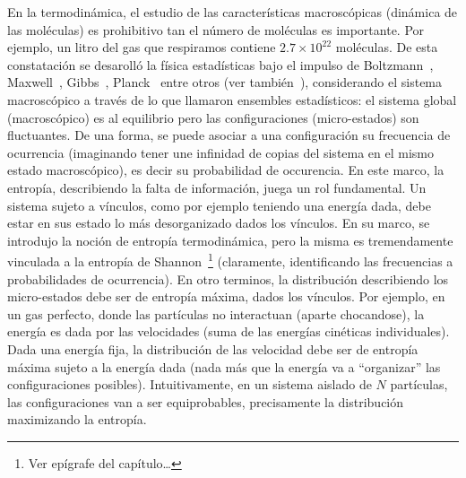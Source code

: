 \label{Sec:SZ:Desigualdades}




\label{Ssec:SZ:MaxEnt}

En  la  termodin\'amica, el  estudio  de  las caracter\'isticas  macrosc\'opicas
(din\'amica de las mol\'eculas) es prohibitivo tan el n\'umero de mol\'eculas es
importante. Por  ejemplo, un litro del  gas que respiramos  contiene $2.7 \times
10^{22}$  mol\'eculas.   De  esta  constataci\'on  se  desaroll\'o  la  f\'isica
estad\'isticas    bajo   el    impulso    de   Boltzmann~\cite{Bol96,    Bol98},
Maxwell~\cite{Max67},  Gibbs~\cite{Gib02}, Planck~\cite{Pla15} entre  otros (ver
tambi\'en~\cite[y   ref.]{Jay65,  Mer10,   Mer18}),   considerando  el   sistema
macrosc\'opico  a  trav\'es de  lo  que  llamaron  ensembles estad\'isticos:  el
sistema  global  (macrosc\'opico)  es  al equilibrio  pero  las  configuraciones
(micro-estados)  son  fluctuantes.   De  una  forma,  se  puede  asociar  a  una
configuraci\'on su  frecuencia de ocurrencia (imaginando tener  une infinidad de
copias del sistema en el  mismo estado macrosc\'opico), es decir su probabilidad
de  occurencia.   En  este  marco,  la  entrop\'ia,  describiendo  la  falta  de
informaci\'on, juega un  rol fundamental.  Un sistema sujeto  a v\'inculos, como
por  ejemplo teniendo  una energ\'ia  dada, debe  estar en  sus estado  lo m\'as
desorganizado dados  los v\'inculos.  En su  marco, se introdujo  la noci\'on de
entrop\'ia  termodin\'amica,  pero la  misma  es  tremendamente  vinculada a  la
entrop\'ia    de   Shannon~\footnote{Ver   ep\'igrafe    del   cap\'itulo\ldots}
(claramente, identificando las frecuencias  a probabilidades de ocurrencia).  En
otro  terminos, la  distribuci\'on describiendo  los micro-estados  debe  ser de
entrop\'ia m\'axima,  dados los  v\'inculos.  Por ejemplo,  en un  gas perfecto,
donde las part\'iculas no interactuan  (aparte chocandose), la energ\'ia es dada
por las velocidades (suma de las energ\'ias cin\'eticas individuales).  Dada una
energ\'ia  fija, la  distribuci\'on  de  las velocidad  debe  ser de  entrop\'ia
m\'axima  sujeto  a  la  energ\'ia  dada  (nada m\'as  que  la  energ\'ia  va  a
``organizar''  las  configuraciones posibles).   Intuitivamente,  en un  sistema
aislado  de  $N$ part\'iculas,  las  configuraciones  van  a ser  equiprobables,
precisamente  la   distribuci\'on  maximizando   la  entrop\'ia.   

